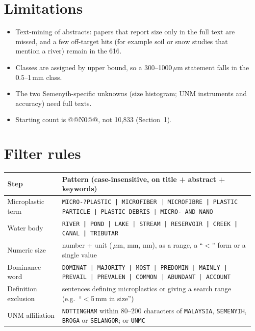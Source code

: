 \documentclass[11pt,a4paper]{article}
\newcommand{\um}{\,\ensuremath{\mu}m}
\begin{document}
\section{Limitations}
\begin{itemize}
\item Text-mining of abstracts: papers that report size only in the full text are missed, and a few off-target hits (for example soil or snow studies that mention a river) remain in the 616.
\item Classes are assigned by upper bound, so a 300--1000\um{} statement falls in the 0.5--1\,mm class.
\item The two Semenyih-specific unknowns (size histogram; UNM instruments and accuracy) need full texts.
\item Starting count is @@N0@@, not 10,833 (Section~1).
\end{itemize}

\appendix
\section{Filter rules}\label{app:rules}
\begin{table}[H]\centering\scriptsize
\begin{tabularx}{\textwidth}{@{}p{3.4cm}X@{}}
\toprule Step & Pattern (case-insensitive, on title + abstract + keywords) \\\midrule
Microplastic term & \texttt{MICRO-?PLASTIC | MICROFIBER | MICROFIBRE | PLASTIC PARTICLE | PLASTIC DEBRIS | MICRO- AND NANO} \\
Water body & \texttt{RIVER | POND | LAKE | STREAM | RESERVOIR | CREEK | CANAL | TRIBUTAR} \\
Numeric size & number + unit (\um, mm, nm), as a range, a ``$<$'' form or a single value \\
Dominance word & \texttt{DOMINAT | MAJORITY | MOST | PREDOMIN | MAINLY | PREVAIL | PREVALEN | COMMON | ABUNDANT | ACCOUNT} \\
Definition exclusion & sentences defining microplastics or giving a search range (e.g.\ ``$<$5\,mm in size'') \\
UNM affiliation & \texttt{NOTTINGHAM} within 80--200 characters of \texttt{MALAYSIA}, \texttt{SEMENYIH}, \texttt{BROGA} or \texttt{SELANGOR}; or \texttt{UNMC} \\
\bottomrule\end{tabularx}
\end{table}
\end{document}

